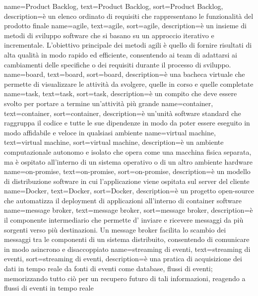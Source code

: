 {
    name={Product Backlog},
    text=Product Backlog,
    sort=Product Backlog,
    description={è un elenco ordinato di requisiti che rappresentano le funzionalità del prodotto finale}
}
{
    name={agile},
    text=agile,
    sort=agile,
    description={è un insieme di metodi di sviluppo software che si basano su un approccio iterativo e incrementale. 
    L'obiettivo principale dei metodi agili è quello di fornire risultati di alta qualità in modo rapido ed efficiente, consentendo ai team di adattarsi ai cambiamenti delle specifiche o dei requisiti durante il processo di sviluppo.}
}
{
    name={board},
    text=board,
    sort=board,
    description={è una bacheca virtuale che permette di visualizzare le attività da svolgere, quelle in corso e quelle completate}
}
{
    name={task},
    text=task,
    sort=task,
    description={è un compito che deve essere svolto per portare a termine un'attività più grande}
}
{
    name={container},
    text=container,
    sort=container,
    description={è un'unità software standard che raggruppa il codice e tutte le sue dipendenze in modo da poter essere eseguito in modo affidabile e veloce in qualsiasi ambiente}
}
{
    name={virtual machine},
    text=virtual machine,
    sort=virtual machine,
    description={è un ambiente computazionale autonomo e isolato che opera come una macchina fisica separata, ma è ospitato all'interno di un sistema operativo o di un altro ambiente hardware}
}
{
    name={on-promise},
    text=on-promise,
    sort=on-promise,
    description={è un modello di distribuzione software in cui l'applicazione viene ospitata sul server del cliente}
}
{
    name={Docker},
    text=Docker,
    sort=Docker,
    description={è un progetto open-source che automatizza il deployment di applicazioni all'interno di container software}
}
{
    name={message broker},
    text=message broker,
    sort=message broker,
    description={è il componente intermediario che permette d' inviare e ricevere messaggi da più sorgenti verso più destinazioni. Un message broker facilita lo scambio dei messaggi 
    tra le componenti di un sistema distribuito, consentendo di comunicare in modo asincrono e disaccoppiato}
}
{
    name={streaming di eventi},
    text=streaming di eventi,
    sort=streaming di eventi,
    description={è una pratica di acquisizione dei dati in tempo reale da fonti di eventi come database, flussi
    di eventi; memorizzando tutto ciò per un recupero futuro di tali informazioni, reagendo a
    flussi di eventi in tempo reale}
}
